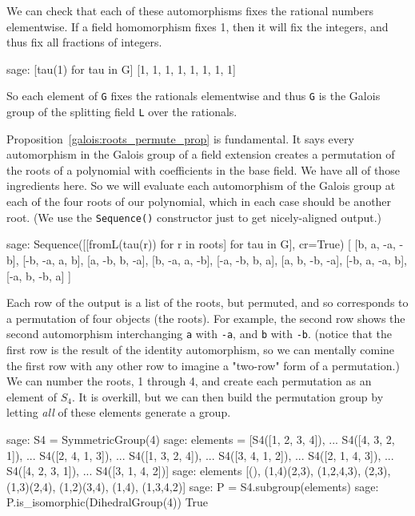%
We can check that each of these automorphisms fixes the rational numbers elementwise.  If a field homomorphism fixes 1, then it will fix the integers, and thus fix all fractions of integers.
%
\begin{sageexample}
sage: [tau(1) for tau in G]
[1, 1, 1, 1, 1, 1, 1, 1]
\end{sageexample}
%
So each element of \verb?G? fixes the rationals elementwise and thus \verb?G? is the Galois group of the splitting field \verb?L? over the rationals.\par
%
Proposition~\ref{galois:roots_permute_prop} is fundamental.  It says every automorphism in the Galois group of a field extension creates a permutation of the roots of a polynomial with coefficients in the base field.  We have all of those ingredients here.  So we will evaluate each automorphism of the Galois group at each of the four roots of our polynomial, which in each case should be another root.  (We use the \verb?Sequence()? constructor just to get nicely-aligned output.)
%
\begin{sageexample}
sage: Sequence([[fromL(tau(r)) for r in roots] for tau in G], cr=True)
[
[b, a, -a, -b],
[-b, -a, a, b],
[a, -b, b, -a],
[b, -a, a, -b],
[-a, -b, b, a],
[a, b, -b, -a],
[-b, a, -a, b],
[-a, b, -b, a]
]
\end{sageexample}
%
Each row of the output is a list of the roots, but permuted, and so corresponds to a permutation of four objects (the roots).  For example, the second row shows the second automorphism interchanging \verb?a? with \verb?-a?, and \verb?b? with \verb?-b?.  (notice that the first row is the result of the identity automorphism, so we can mentally comine the first row with any other row to imagine a "two-row" form of a permutation.)  We can number the roots, 1 through 4, and create each permutation as an element of $S_4$.  It is overkill, but we can then build the permutation group by letting \emph{all} of these elements generate a group.
%
\begin{sageexample}
sage: S4 = SymmetricGroup(4)
sage: elements = [S4([1, 2, 3, 4]),
...               S4([4, 3, 2, 1]),
...               S4([2, 4, 1, 3]),
...               S4([1, 3, 2, 4]),
...               S4([3, 4, 1, 2]),
...               S4([2, 1, 4, 3]),
...               S4([4, 2, 3, 1]),
...               S4([3, 1, 4, 2])]
sage: elements
[(), (1,4)(2,3), (1,2,4,3), (2,3), (1,3)(2,4),
 (1,2)(3,4), (1,4), (1,3,4,2)]
sage: P = S4.subgroup(elements)
sage: P.is_isomorphic(DihedralGroup(4))
True
\end{sageexample}
